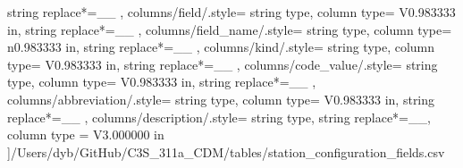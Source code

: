 \begin{landscape}
{            string replace*={_}{\_}
        },
    columns/field/.style={
            string type, 
            column type= V{0.983333 in}, 
            string replace*={_}{\_}
        },
    columns/field_name/.style={
            string type, 
            column type= n{0.983333 in}, 
            string replace*={_}{\_}
        },
    columns/kind/.style={
            string type, 
            column type= V{0.983333 in}, 
            string replace*={_}{\_}
        },
    columns/code_value/.style={
            string type, 
            column type= V{0.983333 in}, 
            string replace*={_}{\_}
        },
    columns/abbreviation/.style={
            string type, 
            column type= V{0.983333 in}, 
            string replace*={_}{\_}
        },
    columns/description/.style={
            string type, 
            string replace*={_}{\_},
            column type = V{3.000000 in}
        }
    ]{/Users/dyb/GitHub/C3S_311a_CDM/tables/station_configuration_fields.csv}
\end{landscape}
